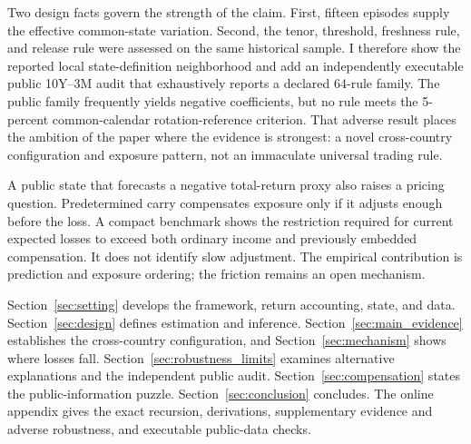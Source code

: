 Two design facts govern the strength of the claim. First, fifteen episodes supply the effective common-state variation. Second, the tenor, threshold, freshness rule, and release rule were assessed on the same historical sample. I therefore show the reported local state-definition neighborhood and add an independently executable public 10Y--3M audit that exhaustively reports a declared 64-rule family. The public family frequently yields negative coefficients, but no rule meets the 5-percent common-calendar rotation-reference criterion. That adverse result places the ambition of the paper where the evidence is strongest: a novel cross-country configuration and exposure pattern, not an immaculate universal trading rule.

A public state that forecasts a negative total-return proxy also raises a pricing question. Predetermined carry compensates exposure only if it adjusts enough before the loss. A compact benchmark shows the restriction required for current expected losses to exceed both ordinary income and previously embedded compensation. It does not identify slow adjustment. The empirical contribution is prediction and exposure ordering; the friction remains an open mechanism.

Section~\ref{sec:setting} develops the framework, return accounting, state, and data. Section~\ref{sec:design} defines estimation and inference. Section~\ref{sec:main_evidence} establishes the cross-country configuration, and Section~\ref{sec:mechanism} shows where losses fall. Section~\ref{sec:robustness_limits} examines alternative explanations and the independent public audit. Section~\ref{sec:compensation} states the public-information puzzle. Section~\ref{sec:conclusion} concludes. The online appendix gives the exact recursion, derivations, supplementary evidence and adverse robustness, and executable public-data checks.

